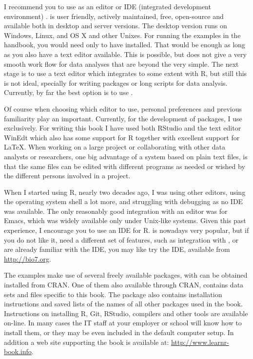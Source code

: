 \documentclass[krantz2,ChapterTOCs]{krantz}\usepackage{knitr}
\begin{document}
I recommend you to use as an editor or IDE (integrated development environment) \RStudio. \RStudio is user friendly, actively maintained, free, open-source and available both in desktop and server versions. The desktop version runs on Windows, Linux, and OS X and other Unixes. For running the examples in the handbook, you would need only to have  installed. That would be enough as long as you also have a text editor available. This is possible, but does not give a very smooth work flow for data analyses that are beyond the very simple. The next stage is to use a text editor which integrates to some extent with R, but still this is not ideal, specially for writing packages or long scripts for data analysis. Currently, by far the best option is to use \RStudio.

Of course when choosing which editor to use, personal preferences and previous familiarity play an important.
Currently, for the development of packages, I use \RStudio exclusively. For writing this book I have used both RStudio and the text editor WinEdt which also has some support for R together with excellent support for \LaTeX. When working on a large project or collaborating with other data analysts or researchers, one big advantage of a system based on plain text files, is that the same files can be edited with different programs as needed or wished by the different persons involved in a project.

When I started using R, nearly two decades ago, I was using other editors, using the operating system shell a lot more, and struggling with debugging as no IDE was available. The only reasonably good integration with an editor was for Emacs, which was widely available only under Unix-like systems. Given this past experience, I encourage you to use an IDE for R. \RStudio is nowadays very popular, but if you do not like it, need a different set of features, such as integration with , or are already familiar with the  IDE, you may like try the  IDE, available from \url{http://bio7.org}.

The examples make use of several freely available packages, with can be obtained installed from CRAN. One of them  also available through CRAN, contains data sets and files specific to this book. The  package also contains installation instructions and saved lists of the names of all other packages used in the book. Instructions on installing R, Git, RStudio, compilers and other tools are available on-line. In many cases the IT staff at your employer or school will know how to install them, or they may be even included in the default computer setup. In addition a web site supporting the book is available at: \url{http://www.learnr-book.info}.
\end{document}
